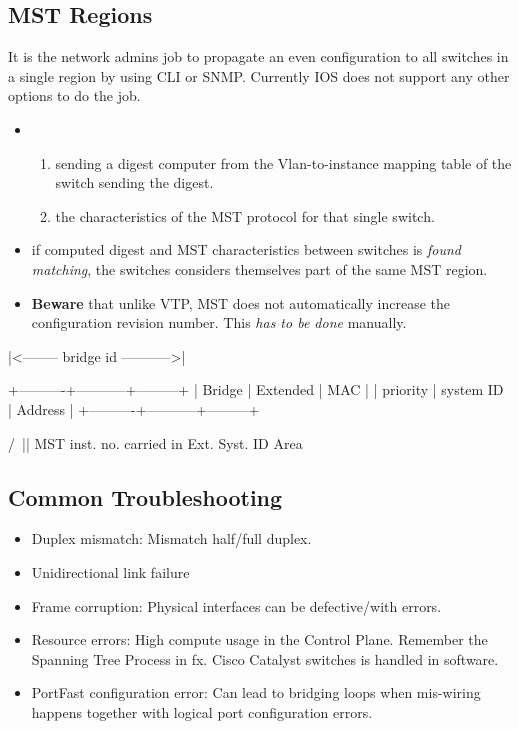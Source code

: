 \subsection{MST Regions}

It is the network admins job to propagate an even configuration to all switches in a single region by using CLI or SNMP. Currently IOS does not support any other options to do the job.

\begin{itemize}
    \item {}
    \begin{enumerate}
        \item sending a digest computer from the Vlan-to-instance mapping table of the switch sending the digest.
        \item the characteristics of the MST protocol for that single switch.
    \end{enumerate}
    \item if computed digest and MST characteristics between switches is \textit{found matching}, the switches considers themselves part of the same MST region.
    \item \textbf{Beware} that unlike VTP, MST does not automatically increase the configuration revision number. This \textit{has to be done} manually.
\end{itemize}



\pagebreak %

\begin{txt}
|<-------- bridge id ----------->|

+----------+-----------+---------+
| Bridge   | Extended  | MAC     |
| priority | system ID | Address |
+----------+-----------+---------+

                /\
                ||
    MST inst. no. carried in
      Ext. Syst. ID Area
\end{txt}

\subsection{Common Troubleshooting}

\begin{itemize}
    \item Duplex mismatch: Mismatch half/full duplex.
    \item Unidirectional link failure
    \item Frame corruption: Physical interfaces can be defective/with errors.
    \item Resource errors: High compute usage in the Control Plane. {\scriptsize Remember the Spanning Tree Process in fx. Cisco Catalyst switches is handled in software.}
    \item PortFast configuration error: Can lead to bridging loops when mis-wiring happens together with logical port configuration errors.
\end{itemize}
